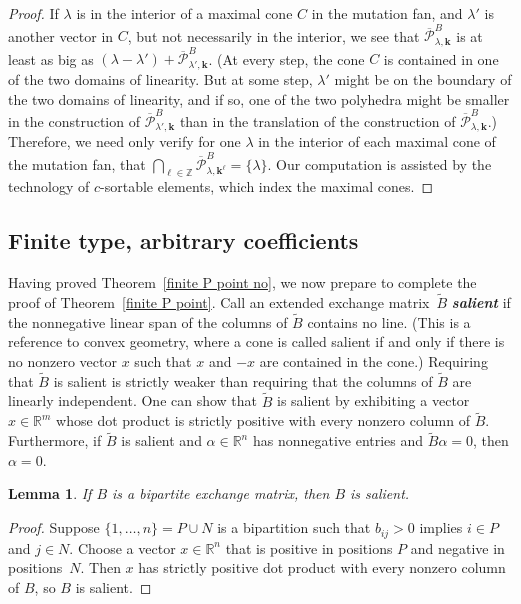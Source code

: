 \documentclass{amsart}
\newtheorem{lemma}[proposition]{Lemma}
\theoremstyle{definition}
\theoremstyle{remark}
\numberwithin{equation}{section}
\newcommand{\newword}[1]{\textbf{\emph{#1}}}
\newcommand{\integers}{\mathbb Z}
\newcommand{\reals}{\mathbb R}
\newcommand{\set}[1]{{\lbrace #1 \rbrace}}
\newcommand{\0}{{\mathbf{0}}}
\newcommand{\kk}{{\boldsymbol{k}}}
\newcommand{\tB}{{\tilde{B}}}
\renewcommand{\P}{\mathcal{P}}
\begin{document}
\begin{proof}
If $\lambda$ is in the interior of a maximal cone $C$ in the mutation fan, and $\lambda'$ is another vector in $C$, but not necessarily in the interior, we see that $\overline{\P}^B_{\lambda,\kk}$ is at least as big as $(\lambda-\lambda')+\overline{\P}^B_{\lambda',\kk}$.
(At every step, the cone $C$ is contained in one of the two domains of linearity.
But at some step, $\lambda'$ might be on the boundary of the two domains of linearity, and if so, one of the two polyhedra might be smaller in the construction of $\overline{\P}^B_{\lambda',\kk}$ than in the translation of the construction of $\overline{\P}^B_{\lambda,\kk}$.)
Therefore, we need only verify for one $\lambda$ in the interior of each maximal cone of the mutation fan, that $\bigcap_{\ell\in\integers}\overline{\P}^B_{\lambda,\kk^\ell}=\set{\lambda}$.
Our computation is assisted by the technology of $c$-sortable elements, which index the maximal cones.
\end{proof}

\subsection{Finite type, arbitrary coefficients}
Having proved Theorem~\ref{finite P point no}, we now prepare to complete the proof of Theorem~\ref{finite P point}.
Call an extended exchange matrix~$\tB$ \newword{salient} if the nonnegative linear span of the columns of $\tB$ contains no line.
(This is a reference to convex geometry, where a cone is called salient if and only if there is no nonzero vector $x$ such that $x$ and $-x$ are contained in the cone.)
Requiring that $\tB$ is salient is strictly weaker than requiring that the columns of $\tB$ are linearly independent.
One can show that $\tB$ is salient by exhibiting a vector $x\in\reals^m$ whose dot product is strictly positive with every nonzero column of $\tB$.
Furthermore, if $\tB$ is salient and $\alpha\in\reals^n$ has nonnegative entries and $\tB\alpha=0$, then $\alpha=0$.

\begin{lemma}\label{bip sal}
If $B$ is a bipartite exchange matrix, then $B$ is salient.
\end{lemma}
\begin{proof}
Suppose $\set{1,\ldots,n}=P\cup N$ is a bipartition such that $b_{ij}>0$ implies $i\in P$ and $j\in N$.
Choose a vector $x\in\reals^n$ that is positive in positions $P$ and negative in positions~$N$.
Then $x$ has strictly positive dot product with every nonzero column of $B$, so $B$ is salient.
\end{proof}
\end{document}
